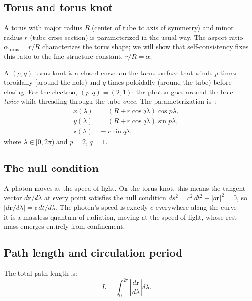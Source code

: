 \documentclass[11pt,a4paper]{article}
\begin{document}
\subsection{Torus and torus knot}

A torus with major radius $R$ (center of tube to axis of symmetry) and minor radius $r$ (tube cross-section) is parameterized in the usual way. The aspect ratio $\alpha_{\text{torus}} = r/R$ characterizes the torus shape; we will show that self-consistency fixes this ratio to the fine-structure constant, $r/R = \alpha$.

A $(p,q)$ torus knot is a closed curve on the torus surface that winds $p$ times toroidally (around the hole) and $q$ times poloidally (around the tube) before closing. For the electron, $(p,q) = (2,1)$: the photon goes around the hole \emph{twice} while threading through the tube \emph{once}. The parameterization is~\cite{paper1}:
\begin{align}
  x(\lambda) &= (R + r\cos q\lambda)\cos p\lambda, \label{eq:torus-x}\\
  y(\lambda) &= (R + r\cos q\lambda)\sin p\lambda, \label{eq:torus-y}\\
  z(\lambda) &= r\sin q\lambda, \label{eq:torus-z}
\end{align}
where $\lambda \in [0, 2\pi)$ and $p = 2$, $q = 1$.

\subsection{The null condition}

A photon moves at the speed of light. On the torus knot, this means the tangent vector $d\mathbf{r}/d\lambda$ at every point satisfies the null condition $ds^2 = c^2\,dt^2 - |d\mathbf{r}|^2 = 0$, so $|d\mathbf{r}/d\lambda| = c\,dt/d\lambda$. The photon's speed is exactly $c$ everywhere along the curve --- it is a massless quantum of radiation, moving at the speed of light, whose rest mass emerges entirely from confinement.

\subsection{Path length and circulation period}

The total path length is:
\begin{equation}
  L = \int_0^{2\pi}\left|\frac{d\mathbf{r}}{d\lambda}\right| d\lambda.
  \label{eq:path-length}
\end{equation}
\end{document}
